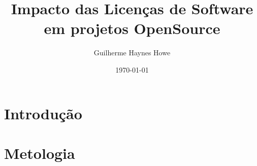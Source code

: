 \documentclass{EstacioArtigo}
\begin{document}
    \title{Impacto das Licenças de Software em projetos OpenSource}
    \author{Guilherme Haynes Howe}
    \date{\today}

    \maketitle

    \makeresume{
        
    }


    \section{Introdução}
    

    \section{Metologia}
    

    
    
\end{document}
